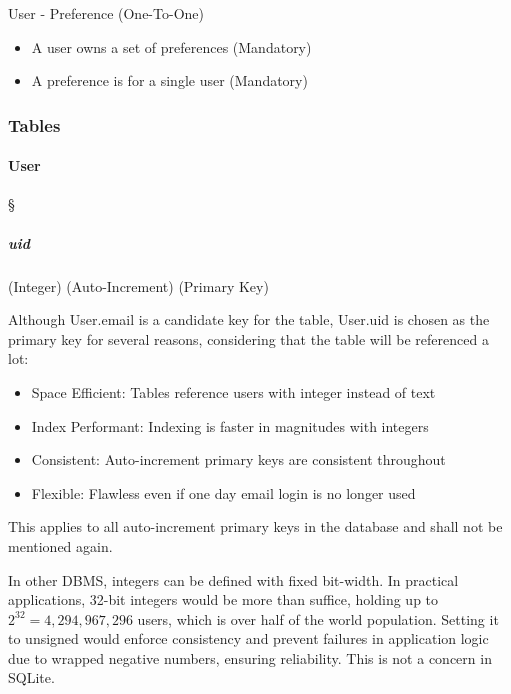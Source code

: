 User - Preference (One-To-One) \textdagger{}
\begin{itemize}
	\item A user owns a set of preferences (Mandatory)

	\item A preference is for a single user (Mandatory)
\end{itemize}

\subsubsection{Tables}
\label{data-layer.design.user.tables}

\paragraph{User}
\S{} \label{data-layer.design.user.tables.user}

\subparagraph{uid}
(Integer) (Auto-Increment) (Primary Key)
\label{data-layer.design.user.tables.user.uid}

Although User.email is a candidate key for the table, User.uid is chosen as the
primary key for several reasons, considering that the table will be referenced a
lot:

\begin{itemize}
	\item Space Efficient: Tables reference users with integer instead of text

	\item Index Performant: Indexing is faster in magnitudes with integers

	\item Consistent: Auto-increment primary keys are consistent throughout

	\item Flexible: Flawless even if one day email login is no longer used
\end{itemize}

This applies to all auto-increment primary keys in the database and shall not be
mentioned again.

\textdagger{} In other DBMS, integers can be defined with fixed bit-width. In practical
applications, 32-bit integers would be more than suffice, holding up to $2^{32}=4
,294,967,296$ users, which is over half of the world population. Setting it to unsigned
would enforce consistency and prevent failures in application logic due to wrapped
negative numbers, ensuring reliability. This is not a concern in SQLite.

